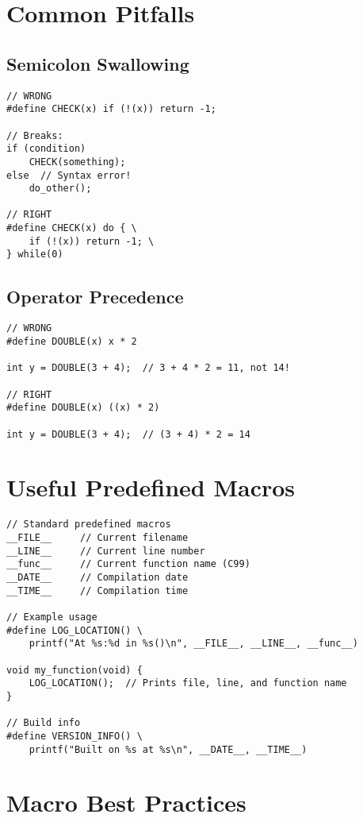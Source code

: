 \section{Common Pitfalls}

\subsection{Semicolon Swallowing}

\begin{lstlisting}
// WRONG
#define CHECK(x) if (!(x)) return -1;

// Breaks:
if (condition)
    CHECK(something);
else  // Syntax error!
    do_other();

// RIGHT
#define CHECK(x) do { \
    if (!(x)) return -1; \
} while(0)
\end{lstlisting}

\subsection{Operator Precedence}

\begin{lstlisting}
// WRONG
#define DOUBLE(x) x * 2

int y = DOUBLE(3 + 4);  // 3 + 4 * 2 = 11, not 14!

// RIGHT
#define DOUBLE(x) ((x) * 2)

int y = DOUBLE(3 + 4);  // (3 + 4) * 2 = 14
\end{lstlisting}

\section{Useful Predefined Macros}

\begin{lstlisting}
// Standard predefined macros
__FILE__     // Current filename
__LINE__     // Current line number
__func__     // Current function name (C99)
__DATE__     // Compilation date
__TIME__     // Compilation time

// Example usage
#define LOG_LOCATION() \
    printf("At %s:%d in %s()\n", __FILE__, __LINE__, __func__)

void my_function(void) {
    LOG_LOCATION();  // Prints file, line, and function name
}

// Build info
#define VERSION_INFO() \
    printf("Built on %s at %s\n", __DATE__, __TIME__)
\end{lstlisting}

\section{Macro Best Practices}

